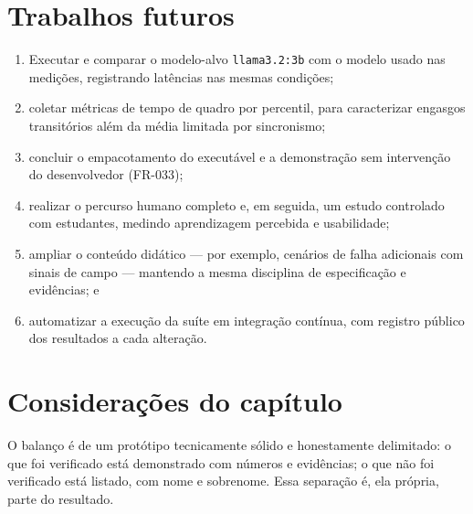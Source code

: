 \section{Trabalhos futuros}
\label{sec:futuros}

\begin{enumerate}
  \item Executar e comparar o modelo-alvo \texttt{llama3.2:3b} com o modelo
  usado nas medições, registrando latências nas mesmas condições;
  \item coletar métricas de tempo de quadro por percentil, para caracterizar
  engasgos transitórios além da média limitada por sincronismo;
  \item concluir o empacotamento do executável e a demonstração sem
  intervenção do desenvolvedor (FR-033);
  \item realizar o percurso humano completo e, em seguida, um estudo
  controlado com estudantes, medindo aprendizagem percebida e usabilidade;
  \item ampliar o conteúdo didático --- por exemplo, cenários de falha
  adicionais com sinais de campo --- mantendo a mesma disciplina de
  especificação e evidências; e
  \item automatizar a execução da suíte em integração contínua, com registro
  público dos resultados a cada alteração.
\end{enumerate}

\section{Considerações do capítulo}
\label{sec:consideracoes_discussao}

O balanço é de um protótipo tecnicamente sólido e honestamente delimitado: o
que foi verificado está demonstrado com números e evidências; o que não foi
verificado está listado, com nome e sobrenome. Essa separação é, ela própria,
parte do resultado.
